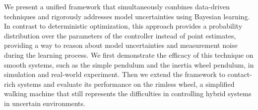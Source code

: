 We present a unified framework that simultaneously combines data-driven
techniques and rigorously addresses model uncertainties using Bayesian learning.
%
%
In contrast to deterministic optimization, this approach provides a probability
distribution over the parameters of the controller instead of point
estimates, providing a way to reason about model uncertainties and measurement
noise during the learning process.
%
We first demonstrate the efficacy of this technique on smooth systems, such as
the simple pendulum and the inertia wheel pendulum, in simulation and real-world
experiment.
%
Then we extend the framework to contact-rich systems and evaluate its
performance on the rimless wheel, a simplified walking machine that still
represents the difficulties in controlling hybrid systems in uncertain
environments.
